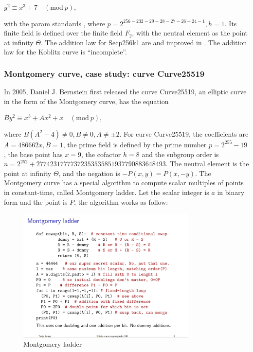 \begin{center}
  $y^2 \equiv x^3 + 7 \quad (\text{mod} \ p)$,
\end{center}

with the param standards \cite{secp256k1}, where $p = 2^{256 - 232 - 29 - 28 - 27 - 26 - 24 - 1}, h = 1$. Its finite field is defined over the finite field $F_2$, with the neutral element as the point at infinity $\Theta$. The addition law for Secp256k1 are \cite{KoblitzAdditionLaw} and improved in \cite{KoblitzCryptosystem}. The addition law for the Koblitz curve is “incomplete”.

\subsubsection{Montgomery curve, case study: curve Curve25519}
In 2005, Daniel J. Bernstein first released the curve Curve25519, an elliptic curve in the form of the Montgomery curve, has the equation

\begin{center}
  $By^2 \equiv x^3 + Ax^2 + x \quad (\text{mod} \ p)$,
\end{center}

where $B(A^2-4) \neq 0, B \neq 0, A \neq \pm 2$. For curve Curve25519, the coefficients are $A = 486662x, B = 1$, the prime field is defined by the prime number $p=2^{255}-19$, the base point has $x = 9$,  the cofactor $h = 8$ and the subgroup order is $n = 2^{252} + 27742317777372353535851937790883648493$. The neutral element is the point at infinity $\Theta$, and the negation is $-P(x, y) = P(x, -y)$. The Montgomery curve has a special algorithm to compute scalar multiples of points in constant-time, called Montgomery ladder. Let the scalar integer is $a$ in binary form and the point is $P$, the algorithm works as follow:

\begin{figure}[ht!]
  \centering
  \includegraphics[width=0.8\textwidth]{images/montgomery_ladder.png}
  \caption[Montgomery ladder]{Montgomery ladder}
  \label{fig:montgomery_ladder}
\end{figure}

